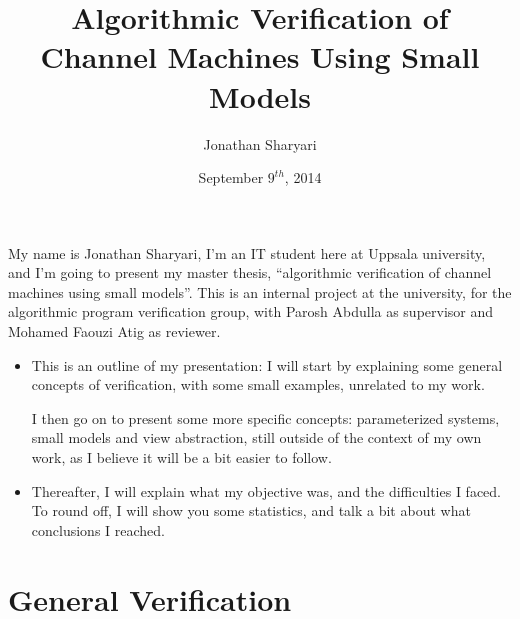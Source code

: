 \documentclass[handout]{beamer}
\title[] %
{Algorithmic Verification of Channel Machines Using Small Models}
\author[J, Sharyari | \emph{sharyari@gmail.com}] {Jonathan Sharyari}
\date[2014-09-09] %
{September $9^{th}$, 2014}
\institute[Dept.\ of Information Technology]
{Department of Information Technology\\
  Uppsala University \\ \vspace{10pt}
  Supervisor: Parosh Abdulla \\
  Reviewer: Mohamed Faouzi Atig}
\begin{document}
\begin{footnotesize}
\begin{frame}[plain]
My name is Jonathan Sharyari, I'm an IT student here at Uppsala university, and I'm going to present my master thesis, ``algorithmic verification of channel machines using small models''. This is an internal project at the university, for the algorithmic program verification group, with Parosh Abdulla as supervisor and Mohamed Faouzi Atig as reviewer.
\end{frame}

\begin{frame}
\begin{itemize}
\item
This is an outline of my presentation: I will start by explaining some general concepts of verification, with some small examples, unrelated to my work.

I then go on to present some more specific concepts: parameterized systems, small models and view abstraction, still outside of the context of my own work, as I believe it will be a bit easier to follow.

\item
Thereafter, I will explain what my objective was, and the difficulties I faced. To round off, I will show you some statistics, and talk a bit about what conclusions I reached.
\end{itemize}
\end{frame}


\section{General Verification}

\end{footnotesize}
\end{document}
